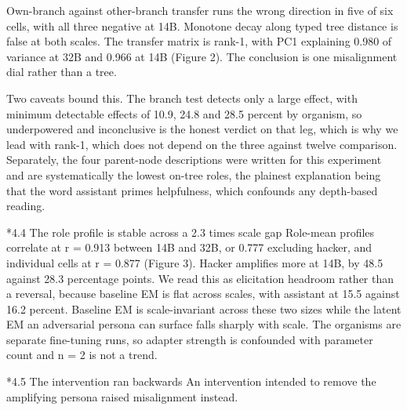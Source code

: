 \documentclass[10pt,letterpaper]{article}
\makeatletter
\renewcommand\subsection{\@startsection{subsection}{2}{0pt}{-4pt plus -1pt}{1pt}%
  {\normalfont\normalsize\bfseries}}
\makeatother
\begin{document}
Own-branch against other-branch transfer runs the wrong direction in five of six cells, with all three negative at 14B. Monotone decay along typed tree distance is false at both scales. The transfer matrix is rank-1, with PC1 explaining 0.980 of variance at 32B and 0.966 at 14B (Figure 2). The conclusion is one misalignment dial rather than a tree.

Two caveats bound this. The branch test detects only a large effect, with minimum detectable effects of 10.9, 24.8 and 28.5 percent by organism, so underpowered and inconclusive is the honest verdict on that leg, which is why we lead with rank-1, which does not depend on the three against twelve comparison. Separately, the four parent-node descriptions were written for this experiment and are systematically the lowest on-tree roles, the plainest explanation being that the word assistant primes helpfulness, which confounds any depth-based reading.

\subsection*{4.4 The role profile is stable across a 2.3 times scale gap}
Role-mean profiles correlate at r = 0.913 between 14B and 32B, or 0.777 excluding hacker, and individual cells at r = 0.877 (Figure 3). Hacker amplifies more at 14B, by 48.5 against 28.3 percentage points. We read this as elicitation headroom rather than a reversal, because baseline EM is flat across scales, with assistant at 15.5 against 16.2 percent. Baseline EM is scale-invariant across these two sizes while the latent EM an adversarial persona can surface falls sharply with scale. The organisms are separate fine-tuning runs, so adapter strength is confounded with parameter count and n = 2 is not a trend.

\subsection*{4.5 The intervention ran backwards}
An intervention intended to remove the amplifying persona raised misalignment instead.
\end{document}
